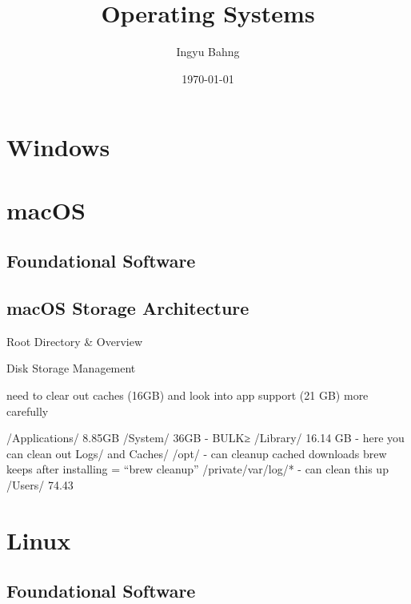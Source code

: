 \documentclass[10pt]{article}
\title{Operating Systems}
\date{\today}
\author{Ingyu Bahng}
\begin{document}


\section{Windows}

\section{macOS}

  \subsection{Foundational Software}

  \subsection{macOS Storage Architecture}
    
    \begin{core}{Root Directory \& Overview}

    \end{core}


    \begin{core}{Disk Storage Management}

      need to clear out caches (16GB) and look into app support (21 GB) more carefully

      /Applications/ 8.85GB
      /System/ 36GB - BULK≥
      /Library/ 16.14 GB
      - here you can clean out Logs/ and Caches/
      /opt/
      - can cleanup cached downloads brew keeps after installing = “brew cleanup”
      /private/var/log/*
      - can clean this up
      /Users/ 74.43 

    \end{core}

\section{Linux}

  \subsection{Foundational Software} 
\end{document}
